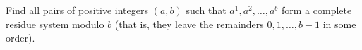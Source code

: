 Find all pairs of positive integers $(a,b)$ such that $a^1,a^2,\dots,a^b$ form a complete residue system modulo $b$ (that is, they leave the remainders $0,1,\dots,b-1$ in some order).
